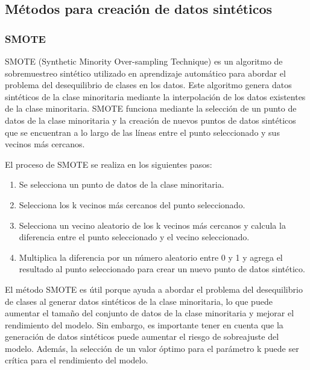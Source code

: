 
\newpage
\subsection{Métodos para creación de datos sintéticos}



\subsubsection{SMOTE}
SMOTE (Synthetic Minority Over-sampling Technique) es un algoritmo de sobremuestreo sintético utilizado en aprendizaje automático para abordar el problema del desequilibrio de clases en los datos. Este algoritmo genera datos sintéticos de la clase minoritaria mediante la interpolación de los datos existentes de la clase minoritaria. SMOTE funciona mediante la selección de un punto de datos de la clase minoritaria y la creación de nuevos puntos de datos sintéticos que se encuentran a lo largo de las líneas entre el punto seleccionado y sus vecinos más cercanos.

El proceso de SMOTE se realiza en los siguientes pasos:

\begin{enumerate}
	\item Se selecciona un punto de datos de la clase minoritaria.
	\item Selecciona los k vecinos más cercanos del punto seleccionado.
	\item Selecciona un vecino aleatorio de los k vecinos más cercanos y calcula la diferencia entre el punto seleccionado y el vecino seleccionado.
	\item Multiplica la diferencia por un número aleatorio entre 0 y 1 y agrega el resultado al punto seleccionado para crear un nuevo punto de datos sintético.
\end{enumerate}

El método SMOTE es útil porque ayuda a abordar el problema del desequilibrio de clases al generar datos sintéticos de la clase minoritaria, lo que puede aumentar el tamaño del conjunto de datos de la clase minoritaria y mejorar el rendimiento del modelo. Sin embargo, es importante tener en cuenta que la generación de datos sintéticos puede aumentar el riesgo de sobreajuste del modelo. Además, la selección de un valor óptimo para el parámetro k puede ser crítica para el rendimiento del modelo.
